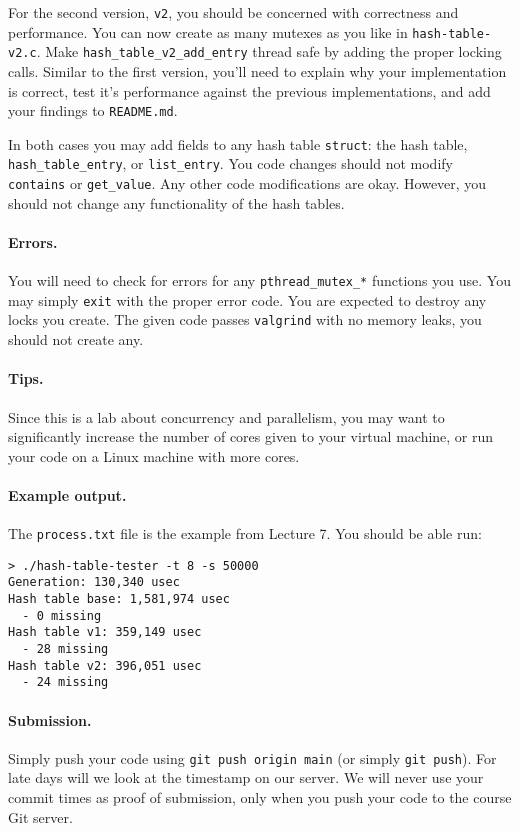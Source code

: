 For the second version, \texttt{v2}, you should be concerned with correctness
and performance.
You can now create as many mutexes as you like in \texttt{hash-table-v2.c}.
Make \texttt{hash\_table\_v2\_add\_entry} thread safe by adding the proper
locking calls.
Similar to the first version, you'll need to explain why your implementation
is correct, test it's performance against the previous implementations, and
add your findings to \texttt{README.md}.

In both cases you may add fields to any hash table \texttt{struct}: the hash
table, \texttt{hash\_table\_entry}, or \texttt{list\_entry}. You code changes
should not modify \texttt{contains} or \texttt{get\_value}. Any other code
modifications are okay. However, you should not change any functionality of the
hash tables.

\paragraph{Errors.}

You will need to check for errors for any \texttt{pthread\_mutex\_*} functions
you use.
You may simply \texttt{exit} with the proper error code.
You are expected to destroy any locks you create.
The given code passes \texttt{valgrind} with no memory leaks, you should not
create any.

\paragraph{Tips.}

Since this is a lab about concurrency and parallelism, you may want to
significantly increase the number of cores given to your virtual machine, or
run your code on a Linux machine with more cores.

\paragraph{Example output.}

The \texttt{process.txt} file is the example from Lecture 7. You should be able
run:

\begin{lstlisting}
> ./hash-table-tester -t 8 -s 50000
Generation: 130,340 usec
Hash table base: 1,581,974 usec
  - 0 missing
Hash table v1: 359,149 usec
  - 28 missing
Hash table v2: 396,051 usec
  - 24 missing
\end{lstlisting}

\paragraph{Submission.}

Simply push your code using \lstinline|git push origin main| (or simply
\lstinline|git push|).
For late days will we look at the timestamp on our server.
We will never use your commit times as proof of submission, only when you
push your code to the course Git server.


